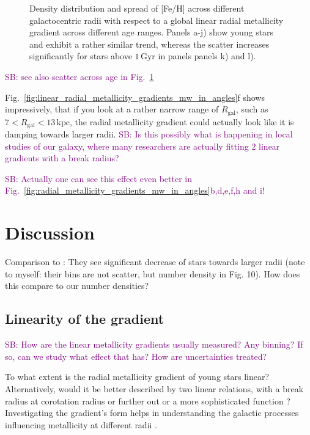 \documentclass[fleqn,usenatbib]{mnras}
\newcommand{\SB}[1]{{\textcolor{purple}{SB: #1}}}
\begin{document}
\begin{figure}
    \caption{Density distribution and spread of [Fe/H] across different galactocentric radii with respect to a global linear radial metallicity gradient across different age ranges. Panels a-j) show young stars and exhibit a rather similar trend, whereas the scatter increases significantly for stars above $1\,\mathrm{Gyr}$ in panels panels k) and l).}
    \label{fig:scatter_with_increasing_age}
\end{figure}

\SB{see also scatter across age in Fig.~\ref{fig:scatter_with_increasing_age}}



Fig.~\ref{fig:linear_radial_metallicity_gradients_mw_in_angles}f shows impressively, that if you look at a rather narrow range of $R_\mathrm{gal}$, such as $7 < R_\mathrm{gal} < 13\,\mathrm{kpc}$, the radial metallicity gradient could actually look like it is damping towards larger radii. \SB{Is this possibly what is happening in local studies of our galaxy, where many researchers are actually fitting 2 linear gradients with a break radius?}

\SB{Actually one can see this effect even better in Fig.~\ref{fig:radial_metallicity_gradients_mw_in_angles}b,d,e,f,h and i!}

\section{Discussion} \label{sec:discussion}

Comparison to \citet[][see their Fig. 10]{Minchev2014b}: They see significant decrease of stars towards larger radii (note to myself: their bins are not scatter, but number density in Fig. 10). How does this compare to our number densities?

\subsection{Linearity of the gradient} \label{sec:discussion_linearity}

\SB{How are the linear metallicity gradients usually measured? Any binning? If so, can we study what effect that has? How are uncertainties treated?}

To what extent is the radial metallicity gradient of young stars linear? Alternatively, would it be better described by two linear relations, with a break radius at corotation radius \citep[][and references therein]{Bresolin2012} or further out \citep{Donor2020} or a more sophisticated function \citep[see e.g.][]{Chiappini2001, Kubryk2015}? Investigating the gradient's form helps in understanding the galactic processes influencing metallicity at different radii \citep{Minchev2014b}.
\end{document}
